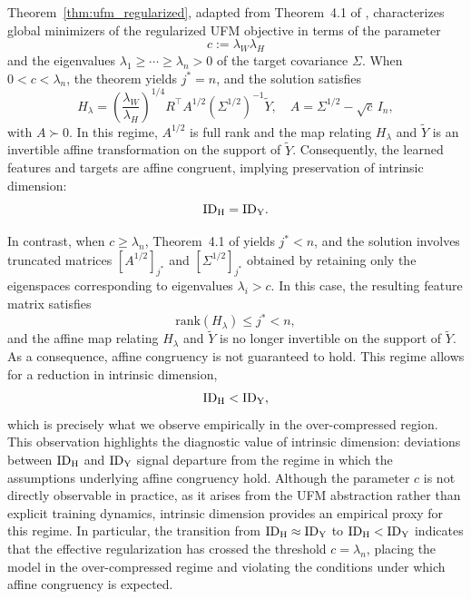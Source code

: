 \begin{remark}
\label{rem:ufm_affine_congruency}

Theorem~\ref{thm:ufm_regularized}, adapted from Theorem~4.1 of \citet{andriopoulos2024prevalence}, characterizes global minimizers of the regularized UFM objective in terms of the parameter
\[
c := \lambda_W \lambda_H
\]
and the eigenvalues $\lambda_1 \ge \cdots \ge \lambda_n > 0$ of the target covariance $\Sigma$.
When $0 < c < \lambda_n$, the theorem yields $j^{\ast} = n$, and the solution satisfies
\[
H_\lambda
= \left(\frac{\lambda_W}{\lambda_H}\right)^{1/4}
R^\top A^{1/2} (\Sigma^{1/2})^{-1} \tilde{Y},
\quad
A = \Sigma^{1/2} - \sqrt{c}\, I_n,
\]
with $A \succ 0$. In this regime, $A^{1/2}$ is full rank and the map relating $H_\lambda$ and $\tilde{Y}$ is an invertible affine transformation on the support of $\tilde{Y}$. Consequently, the learned features and targets are affine congruent, implying preservation of intrinsic dimension:
\[
\mathrm{ID}_{\mathrm{H}} = \mathrm{ID}_{\mathrm{Y}}.
\]

In contrast, when $c \ge \lambda_n$, Theorem~4.1 of \citet{andriopoulos2024prevalence} yields $j^{\ast} < n$, and the solution involves truncated matrices $[A^{1/2}]_{j^{\ast}}$ and $[\Sigma^{1/2}]_{j^{\ast}}$ obtained by retaining only the eigenspaces corresponding to eigenvalues $\lambda_i > c$. In this case, the resulting feature matrix satisfies
\[
\text{rank}(H_\lambda) \le j^{\ast} < n,
\]
and the affine map relating $H_\lambda$ and $\tilde{Y}$ is no longer invertible on the support of $\tilde{Y}$. As a consequence, affine congruency is not guaranteed to hold. This regime allows for a reduction in intrinsic dimension,
\[
\mathrm{ID}_{\mathrm{H}} < \mathrm{ID}_{\mathrm{Y}},
\]
which is precisely what we observe empirically in the over-compressed region. This observation highlights the diagnostic value of intrinsic dimension: deviations between $\mathrm{ID}_{\mathrm{H}}$ and $\mathrm{ID}_{\mathrm{Y}}$ signal departure from the regime in which the assumptions underlying affine congruency hold. Although the parameter $c$ is not directly observable in practice, as it arises from the UFM abstraction rather than explicit training dynamics, intrinsic dimension provides an empirical proxy for this regime. In particular, the transition from $\mathrm{ID}_{\mathrm{H}} \approx \mathrm{ID}_{\mathrm{Y}}$ to $\mathrm{ID}_{\mathrm{H}} < \mathrm{ID}_{\mathrm{Y}}$ indicates that the effective regularization has crossed the threshold $c = \lambda_n$, placing the model in the over-compressed regime and violating the conditions under which affine congruency is expected.

\end{remark}



